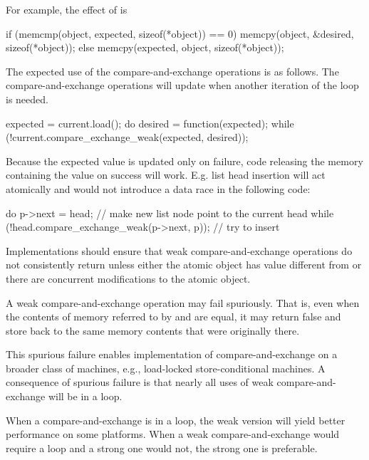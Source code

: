 \begin{itemdescr}
\pnum
\begin{note} For example, the effect of
 is
\begin{codeblock}
if (memcmp(object, expected, sizeof(*object)) == 0)
  memcpy(object, &desired, sizeof(*object));
else
  memcpy(expected, object, sizeof(*object));
\end{codeblock}
\end{note}
\begin{example} The expected use of the compare-and-exchange operations is as follows. The
compare-and-exchange operations will update  when another iteration of
the loop is needed.
\begin{codeblock}
expected = current.load();
do {
  desired = function(expected);
} while (!current.compare_exchange_weak(expected, desired));
\end{codeblock}
\end{example}
\begin{example} Because the expected value is updated only on failure,
code releasing the memory containing the  value on success will work.
E.g. list head insertion will act atomically and would not introduce a
data race in the following code:
\begin{codeblock}
do {
  p->next = head; // make new list node point to the current head
} while (!head.compare_exchange_weak(p->next, p)); // try to insert
\end{codeblock}
\end{example}

\pnum
Implementations should ensure that weak compare-and-exchange operations do not
consistently return  unless either the atomic object has value
different from  or there are concurrent modifications to the
atomic object.

\pnum
\remarks
A weak compare-and-exchange operation may fail spuriously. That is, even when
the contents of memory referred to by  and  are
equal, it may return false and store back to  the same memory
contents that were originally there.
\begin{note} This
spurious failure enables implementation of compare-and-exchange on a broader class of
machines, e.g., load-locked store-conditional machines. A
consequence of spurious failure is that nearly all uses of weak compare-and-exchange
will be in a loop.

When a compare-and-exchange is in a loop, the weak version will yield better performance
on some platforms. When a weak compare-and-exchange would require a loop and a strong one
would not, the strong one is preferable.
\end{note}


\end{itemdescr}
